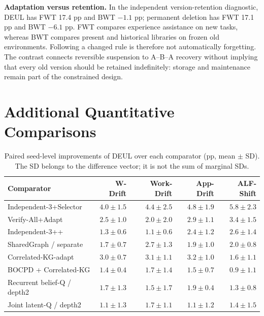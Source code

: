 \documentclass[sigconf,anonymous,review]{acmart}
\theoremstyle{zhplain}
\begin{document}
\textbf{Adaptation versus retention.} In the independent version-retention diagnostic, DEUL has FWT 17.4 pp and BWT \(-1.1\) pp; permanent deletion has FWT 17.1 pp and BWT \(-6.1\) pp. FWT compares experience assistance on new tasks, whereas BWT compares present and historical libraries on frozen old environments. Following a changed rule is therefore not automatically forgetting. The contrast connects reversible suspension to A--B--A recovery without implying that every old version should be retained indefinitely: storage and maintenance remain part of the constrained design.

\section{Additional Quantitative Comparisons}
\label{app:results}

\begin{table}[t]
\centering
\caption{Paired seed-level improvements of DEUL over each comparator (pp, mean \(\pm\) SD). The SD belongs to the difference vector; it is not the sum of marginal SDs.}
\label{tab:diff}
\small
\begin{tabular}{@{}lrrrr@{}}
\toprule
Comparator & W-Drift & Work-Drift & App-Drift & ALF-Shift \\
\midrule
Independent-3+Selector & \(4.0\!\pm\!1.5\) & \(4.4\!\pm\!2.5\) & \(4.8\!\pm\!1.9\) & \(5.8\!\pm\!2.3\) \\
Verify-All+Adapt & \(2.5\!\pm\!1.0\) & \(2.0\!\pm\!2.0\) & \(2.9\!\pm\!1.1\) & \(3.4\!\pm\!1.5\) \\
Independent-3++ & \(1.3\!\pm\!0.6\) & \(1.1\!\pm\!0.6\) & \(2.4\!\pm\!1.2\) & \(2.6\!\pm\!1.4\) \\
SharedGraph / separate & \(1.7\!\pm\!0.7\) & \(2.7\!\pm\!1.3\) & \(1.9\!\pm\!1.0\) & \(2.0\!\pm\!0.8\) \\
Correlated-KG-adapt & \(3.0\!\pm\!0.7\) & \(3.1\!\pm\!1.1\) & \(3.2\!\pm\!1.0\) & \(1.6\!\pm\!1.1\) \\
BOCPD + Correlated-KG & \(1.4\!\pm\!0.4\) & \(1.7\!\pm\!1.4\) & \(1.5\!\pm\!0.7\) & \(0.9\!\pm\!1.1\) \\
Recurrent belief-Q / depth2 & \(1.7\!\pm\!1.3\) & \(1.5\!\pm\!1.7\) & \(1.9\!\pm\!0.4\) & \(1.3\!\pm\!0.8\) \\
Joint latent-Q / depth2 & \(1.1\!\pm\!1.3\) & \(1.7\!\pm\!1.1\) & \(1.1\!\pm\!1.2\) & \(1.4\!\pm\!1.5\) \\
\bottomrule
\end{tabular}
\end{table}
\end{document}
